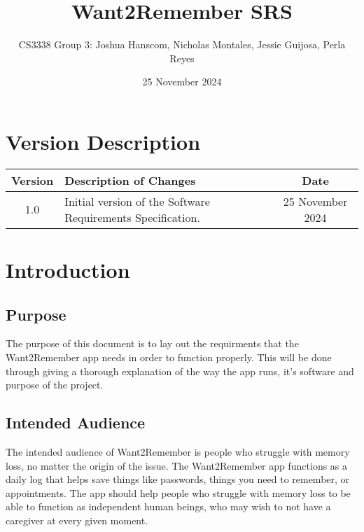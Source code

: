 \documentclass{article}
\title{Want2Remember SRS}
\author{CS3338 Group 3: Joshua Hanscom, Nicholas Montales, Jessie Guijosa, Perla Reyes}
\date{25 November 2024}
\begin{document}
\maketitle
\newpage
\tableofcontents
\newpage
\section*{Version Description}
\begin{tabular}{|c|p{10cm}|c|}
\hline
\textbf{Version} & \textbf{Description of Changes} & \textbf{Date} \\ \hline
1.0 & Initial version of the Software Requirements Specification. & 25 November 2024 \\ \hline
\end{tabular}
\newpage

\section{Introduction}
\subsection{Purpose}
The purpose of this document is to lay out the requirments that the Want2Remember app needs in order to function properly. This will be done through giving a thorough explanation of the way the app runs, it's software and purpose of the project.

\subsection{Intended Audience}
The intended audience of Want2Remember is people who struggle with memory loss, no matter the origin of the issue. The Want2Remember app functions as a daily log that helps save things like passwords, things you need to remember, or appointments. The app should help people who struggle with memory loss to be able to function as independent human beings, who may wish to not have a caregiver at every given moment. 
\end{document}
